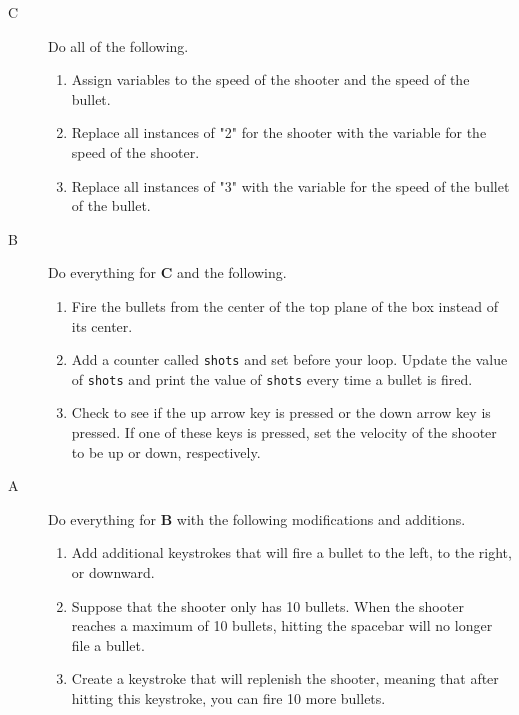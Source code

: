 \begin{description}

\item[C] Do all of the following.
\begin{enumerate}
	\item Assign variables to the speed of the shooter and the speed of the bullet.
	\item Replace all instances of "2" for the shooter with the variable for the speed of the shooter.
	\item Replace all instances of "3" with the variable for the speed of the bullet of the bullet.
\end{enumerate}

\item[B] Do everything for {\bf C} and the following.

\begin{enumerate}
	\item Fire the bullets from the center of the top plane of the box instead of its center.
	\item Add a counter called \texttt{shots} and set  before your  loop. Update the value of \texttt{shots} and print the value of \texttt{shots} every time a bullet is fired.
	\item Check to see if the up arrow key is pressed or the down arrow key is pressed. If one of these keys is pressed, set the velocity of the shooter to be up or down, respectively.
\end{enumerate}

\item[A] Do everything for {\bf B} with the following modifications and additions.

\begin{enumerate}
	\item Add additional keystrokes that will fire a bullet to the left, to the right, or downward.
	\item Suppose that the shooter only has 10 bullets. When the shooter reaches a maximum of 10 bullets, hitting the spacebar will no longer file a bullet.
	\item Create a keystroke that will replenish the shooter, meaning that after hitting this keystroke, you can fire 10 more bullets.
\end{enumerate}




\end{description}

